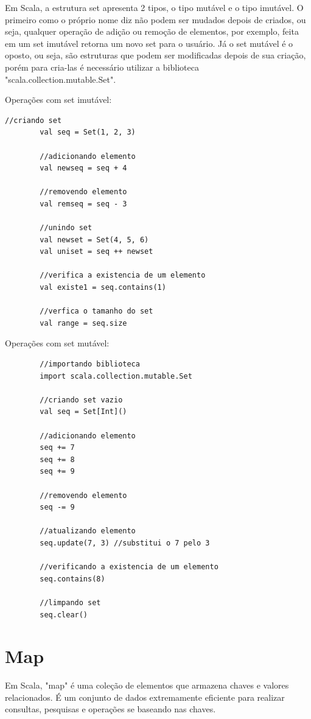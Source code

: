	Em Scala, a estrutura set apresenta 2 tipos, o tipo mutável e o tipo imutável. O primeiro como o próprio nome diz não podem ser mudados depois de criados, ou seja, qualquer operação de adição ou remoção de elementos, por exemplo, feita em um set imutável retorna um novo set para o usuário. Já o set mutável é o oposto, ou seja, são estruturas que podem ser modificadas depois de sua criação, porém para cria-las é necessário utilizar a biblioteca "scala.collection.mutable.Set".
	
	Operações com set imutável: 
	
	\begin{lstlisting}[breaklines]
		//criando set
		val seq = Set(1, 2, 3)
		
		//adicionando elemento 
		val newseq = seq + 4
		
		//removendo elemento
		val remseq = seq - 3
		
		//unindo set
		val newset = Set(4, 5, 6)
		val uniset = seq ++ newset
		
		//verifica a existencia de um elemento
		val existe1 = seq.contains(1)
		
		//verfica o tamanho do set
		val range = seq.size
	\end{lstlisting}

	Operações com set mutável: 
	
	\begin{lstlisting}
		//importando biblioteca
		import scala.collection.mutable.Set
		
		//criando set vazio
		val seq = Set[Int]()
		
		//adicionando elemento
		seq += 7
		seq += 8
		seq += 9
		
		//removendo elemento
		seq -= 9
		
		//atualizando elemento
		seq.update(7, 3) //substitui o 7 pelo 3
		
		//verificando a existencia de um elemento
		seq.contains(8)
		
		//limpando set
		seq.clear()
	\end{lstlisting}

    \section{Map}
    
    Em Scala, "map" é uma coleção de elementos que armazena chaves e valores relacionados. É um conjunto de dados extremamente eficiente para realizar consultas, pesquisas e operações se baseando nas chaves.
    
